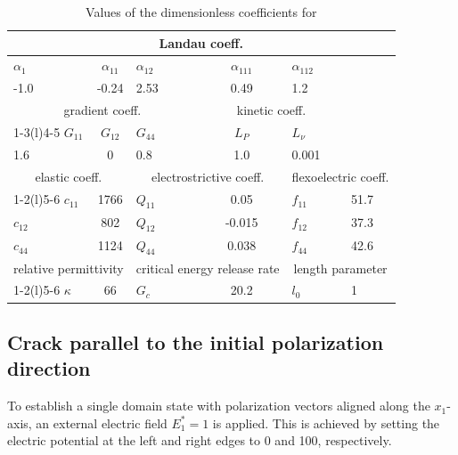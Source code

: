 \documentclass[times,fleqn,11pt]{elsarticle}
\begin{document}
\begin{table}[!htbp]
    \centering
    \caption{Values of the dimensionless coefficients for \cite{yong_zhang_phase_2022,eliseev_defect-driven_2018}}
    \label{table1}
    \begin{tabular}{lclcll}
        \toprule
        \multicolumn{6}{c}{Landau coeff.}                                                   \\ \midrule
        $\alpha_1$ & $\alpha_{11}$ & $\alpha_{12}$ & $\alpha_{111}$   & $\alpha_{112}$  &   \\
        -1.0          & -0.24            & 2.53             & 0.49               & 1.2               &   \\
        \multicolumn{3}{c}{gradient coeff.}        & \multicolumn{2}{c}{kinetic coeff.} &   \\ \cmidrule(r){1-3}\cmidrule(l){4-5}
        $G_{11}$   & $G_{12}$      & $G_{44}$      & $L_P$            & $L_\nu$         &   \\
        1.6          & 0             & 0.8             & 1.0                & 0.001               &   \\
        \multicolumn{2}{c}{elastic coeff.}        & \multicolumn{2}{c}{electrostrictive coeff.}      & \multicolumn{2}{c}{flexoelectric coeff.} \\ \cmidrule(r){1-2}\cmidrule{3-4}\cmidrule(l){5-6}
        $c_{11}$   & 1766             & $Q_{11}$      & 0.05                & $f_{11}$        & 51.7 \\
        $c_{12}$   & 802              & $Q_{12}$      &  -0.015              & $f_{12}$        & 37.3 \\
        $c_{44}$   & 1124             & $Q_{44}$      &  0.038              & $f_{44}$        & 42.6 \\
        \multicolumn{2}{c}{relative permittivity} & \multicolumn{2}{c}{critical energy release rate} & \multicolumn{2}{c}{length parameter}      \\ \cmidrule(r){1-2}\cmidrule{3-4}\cmidrule(l){5-6}
        $\kappa$   & 66            & $G_c$         & 20.2               & $l_0$           & 1 \\ \bottomrule
        \end{tabular}
\end{table}

\subsection{Crack parallel to the initial polarization direction}
To establish a single domain state with polarization vectors aligned along the $x_1$-axis, an external electric field $E_{1}^*=1$ is applied. This is achieved by setting the electric potential at the left and right edges to 0 and 100, respectively. 
\end{document}
